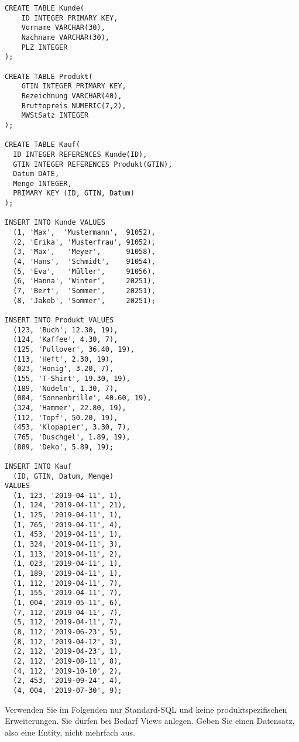 \documentclass{bschlangaul-aufgabe}
\begin{document}
\begin{bAdditum}[Übungstabelle]
\begin{verbatim}
CREATE TABLE Kunde(
	ID INTEGER PRIMARY KEY,
	Vorname VARCHAR(30),
	Nachname VARCHAR(30),
	PLZ INTEGER
);

CREATE TABLE Produkt(
	GTIN INTEGER PRIMARY KEY,
	Bezeichnung VARCHAR(40),
	Bruttopreis NUMERIC(7,2),
	MWStSatz INTEGER
);

CREATE TABLE Kauf(
  ID INTEGER REFERENCES Kunde(ID),
  GTIN INTEGER REFERENCES Produkt(GTIN),
  Datum DATE,
  Menge INTEGER,
  PRIMARY KEY (ID, GTIN, Datum)
);

INSERT INTO Kunde VALUES
  (1, 'Max',  'Mustermann',  91052),
  (2, 'Erika', 'Musterfrau', 91052),
  (3, 'Max',   'Meyer',      91058),
  (4, 'Hans',  'Schmidt',    91054),
  (5, 'Eva',   'Müller',     91056),
  (6, 'Hanna', 'Winter',     20251),
  (7, 'Bert',  'Sommer',     20251),
  (8, 'Jakob', 'Sommer',     20251);

INSERT INTO Produkt VALUES
  (123, 'Buch', 12.30, 19),
  (124, 'Kaffee', 4.30, 7),
  (125, 'Pullover', 36.40, 19),
  (113, 'Heft', 2.30, 19),
  (023, 'Honig', 3.20, 7),
  (155, 'T-Shirt', 19.30, 19),
  (189, 'Nudeln', 1.30, 7),
  (004, 'Sonnenbrille', 40.60, 19),
  (324, 'Hammer', 22.80, 19),
  (112, 'Topf', 50.20, 19),
  (453, 'Klopapier', 3.30, 7),
  (765, 'Duschgel', 1.89, 19),
  (889, 'Deko', 5.89, 19);

INSERT INTO Kauf
  (ID, GTIN, Datum, Menge)
VALUES
  (1, 123, '2019-04-11', 1),
  (1, 124, '2019-04-11', 21),
  (1, 125, '2019-04-11', 1),
  (1, 765, '2019-04-11', 4),
  (1, 453, '2019-04-11', 1),
  (1, 324, '2019-04-11', 3),
  (1, 113, '2019-04-11', 2),
  (1, 023, '2019-04-11', 1),
  (1, 189, '2019-04-11', 1),
  (1, 112, '2019-04-11', 7),
  (1, 155, '2019-04-11', 7),
  (1, 004, '2019-05-11', 6),
  (7, 112, '2019-04-11', 7),
  (5, 112, '2019-04-11', 7),
  (8, 112, '2019-06-23', 5),
  (8, 112, '2019-04-12', 3),
  (2, 112, '2019-04-23', 1),
  (2, 112, '2019-08-11', 8),
  (4, 112, '2019-10-10', 2),
  (2, 453, '2019-09-24', 4),
  (4, 004, '2019-07-30', 9);
\end{verbatim}
\end{bAdditum}

Verwenden Sie im Folgenden nur Standard-SQL und keine
produktspezifischen Erweiterungen. Sie dürfen bei Bedarf Views anlegen.
Geben Sie einen Datensatz, also eine Entity, nicht mehrfach aus.
\end{document}
